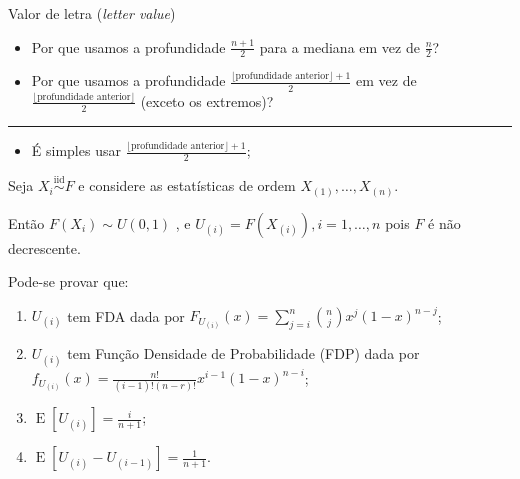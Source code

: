 \documentclass[
  10pt,
  ignorenonframetext,
]{beamer}
\providecommand{\tightlist}{%
  \setlength{\itemsep}{0pt}\setlength{\parskip}{0pt}}\usepackage{longtable,booktabs,array}
\DeclareMathOperator{\espe}{E}
\newcommand*{\regrafina}{\rule{\textwidth}{0.5pt}}
\begin{document}
\begin{frame}
\begin{figure}
\begin{tikzpicture}[x=0.75pt,y=0.75pt,yscale=-1,xscale=1]
\end{tikzpicture}

\end{figure}
\end{frame}

\begin{frame}{Valor de letra (\emph{letter value})}
\protect\hypertarget{valor-de-letra-letter-value-1}{}
\begin{itemize}
\tightlist
\item
  Por que usamos a profundidade \(\frac{n+1}{2}\) para a mediana em vez
  de \(\frac{n}{2}\)?
\item
  Por que usamos a profundidade
  \(\frac{\lfloor \text{profundidade anterior} \rfloor + 1}{2}\) em vez
  de \(\frac{\lfloor \text{profundidade anterior} \rfloor}{2}\) (exceto
  os extremos)?
\end{itemize}

\regrafina

\begin{itemize}
\tightlist
\item
  É simples usar
  \(\frac{\lfloor \text{profundidade anterior} \rfloor + 1}{2}\);
\end{itemize}

Seja \(X_i \stackrel{\text{iid}}{\sim} F\) e considere as estatísticas
de ordem \(X_{(1)}, \dots, X_{(n)}\).

Então \(F(X_i) \sim U(0,1)\) , e \(U_{(i)}=F(X_{(i)}), i=1,\dots,n\)
pois \(F\) é não decrescente.

Pode-se provar que:

\begin{enumerate}
\tightlist
\item
  \(U_{(i)}\) tem FDA dada por
  \(F_{U_{(i)}}(x) = \sum_{j=i}^{n} \binom{n}{j} x^j(1-x)^{n-j}\);
\item
  \(U_{(i)}\) tem Função Densidade de Probabilidade (FDP) dada por
  \(f_{U_{(i)}}(x) = \frac{n!}{(i-1)! (n-r)!} x^{i-1}(1-x)^{n-i}\);
\item
  \(\espe[U_{(i)}] = \frac{i}{n+1}\);
\item
  \(\espe[U_{(i)} - U_{(i-1)}] = \frac{1}{n+1}\).
\end{enumerate}
\end{frame}
\end{document}
